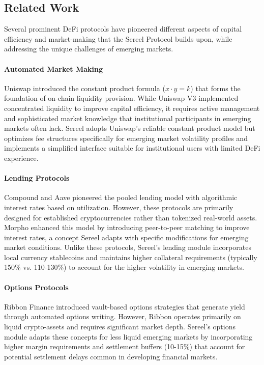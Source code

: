 \documentclass[12pt]{article}
\begin{document}
\subsection{Related Work}

Several prominent DeFi protocols have pioneered different aspects of capital efficiency and market-making that the Sereel Protocol builds upon, while addressing the unique challenges of emerging markets.

\paragraph{Automated Market Making}
Uniswap \citep{buterin2014ethereum} introduced the constant product formula ($x \cdot y = k$) that forms the foundation of on-chain liquidity provision. While Uniswap V3 implemented concentrated liquidity to improve capital efficiency, it requires active management and sophisticated market knowledge that institutional participants in emerging markets often lack. Sereel adopts Uniswap's reliable constant product model but optimizes fee structures specifically for emerging market volatility profiles and implements a simplified interface suitable for institutional users with limited DeFi experience.

\paragraph{Lending Protocols}
Compound \citep{buterin2014ethereum} and Aave pioneered the pooled lending model with algorithmic interest rates based on utilization. However, these protocols are primarily designed for established cryptocurrencies rather than tokenized real-world assets. Morpho enhanced this model by introducing peer-to-peer matching to improve interest rates, a concept Sereel adapts with specific modifications for emerging market conditions. Unlike these protocols, Sereel's lending module incorporates local currency stablecoins and maintains higher collateral requirements (typically 150\% vs. 110-130\%) to account for the higher volatility in emerging markets.

\paragraph{Options Protocols}
Ribbon Finance introduced vault-based options strategies that generate yield through automated options writing. However, Ribbon operates primarily on liquid crypto-assets and requires significant market depth. Sereel's options module adapts these concepts for less liquid emerging markets by incorporating higher margin requirements and settlement buffers (10-15\%) that account for potential settlement delays common in developing financial markets.
\end{document}
